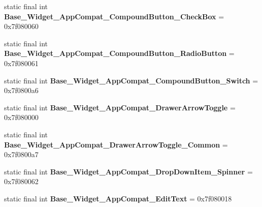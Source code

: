\begin{DoxyCompactItemize}
\item 
\hypertarget{classandroid_1_1support_1_1v7_1_1appcompat_1_1_r_1_1style_a73ef775f81633470d8a108c06b0e4274}{}static final int {\bfseries Base\+\_\+\+Widget\+\_\+\+App\+Compat\+\_\+\+Compound\+Button\+\_\+\+Check\+Box} = 0x7f080060\label{classandroid_1_1support_1_1v7_1_1appcompat_1_1_r_1_1style_a73ef775f81633470d8a108c06b0e4274}

\item 
\hypertarget{classandroid_1_1support_1_1v7_1_1appcompat_1_1_r_1_1style_acbae6d6c74db639172d499065f47cb55}{}static final int {\bfseries Base\+\_\+\+Widget\+\_\+\+App\+Compat\+\_\+\+Compound\+Button\+\_\+\+Radio\+Button} = 0x7f080061\label{classandroid_1_1support_1_1v7_1_1appcompat_1_1_r_1_1style_acbae6d6c74db639172d499065f47cb55}

\item 
\hypertarget{classandroid_1_1support_1_1v7_1_1appcompat_1_1_r_1_1style_add3a6916e7c77510f29c2c1cbe208285}{}static final int {\bfseries Base\+\_\+\+Widget\+\_\+\+App\+Compat\+\_\+\+Compound\+Button\+\_\+\+Switch} = 0x7f0800a6\label{classandroid_1_1support_1_1v7_1_1appcompat_1_1_r_1_1style_add3a6916e7c77510f29c2c1cbe208285}

\item 
\hypertarget{classandroid_1_1support_1_1v7_1_1appcompat_1_1_r_1_1style_ac82ba537759e8daad392e766d595d175}{}static final int {\bfseries Base\+\_\+\+Widget\+\_\+\+App\+Compat\+\_\+\+Drawer\+Arrow\+Toggle} = 0x7f080000\label{classandroid_1_1support_1_1v7_1_1appcompat_1_1_r_1_1style_ac82ba537759e8daad392e766d595d175}

\item 
\hypertarget{classandroid_1_1support_1_1v7_1_1appcompat_1_1_r_1_1style_a31ca1ef9f55174e1ef5873ac1cfb023b}{}static final int {\bfseries Base\+\_\+\+Widget\+\_\+\+App\+Compat\+\_\+\+Drawer\+Arrow\+Toggle\+\_\+\+Common} = 0x7f0800a7\label{classandroid_1_1support_1_1v7_1_1appcompat_1_1_r_1_1style_a31ca1ef9f55174e1ef5873ac1cfb023b}

\item 
\hypertarget{classandroid_1_1support_1_1v7_1_1appcompat_1_1_r_1_1style_a97a797d8997eff253a8e48da27e1e8a7}{}static final int {\bfseries Base\+\_\+\+Widget\+\_\+\+App\+Compat\+\_\+\+Drop\+Down\+Item\+\_\+\+Spinner} = 0x7f080062\label{classandroid_1_1support_1_1v7_1_1appcompat_1_1_r_1_1style_a97a797d8997eff253a8e48da27e1e8a7}

\item 
\hypertarget{classandroid_1_1support_1_1v7_1_1appcompat_1_1_r_1_1style_aded95edb41cbd1388bd486866f151cd3}{}static final int {\bfseries Base\+\_\+\+Widget\+\_\+\+App\+Compat\+\_\+\+Edit\+Text} = 0x7f080018\label{classandroid_1_1support_1_1v7_1_1appcompat_1_1_r_1_1style_aded95edb41cbd1388bd486866f151cd3}


\end{DoxyCompactItemize}
